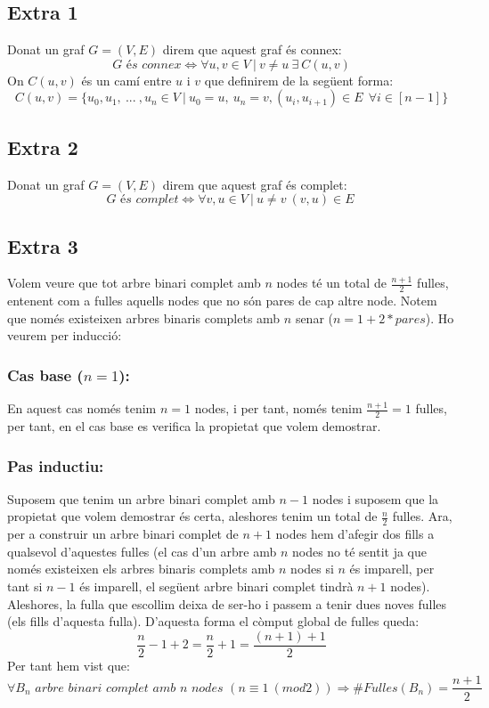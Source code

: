 \documentclass[a4paper,12pt]{article}
\begin{document}
\subsection*{Extra 1}
Donat un graf $G = (V,E)$ direm que aquest graf és connex:
$$G \textit{ és connex} \Longleftrightarrow \forall u, v \in V \ | \ v \neq u \ \exists \ C(u,v)$$
On $C(u,v)$ és un camí entre $u$ i $v$ que definirem de la següent forma:
$$C(u,v) = \{u_0, u_1, \ ... \ , u_n \in V \ | \ u_0 = u, \ u_n = v, (u_i, u_{i+1}) \in E \ \ \forall i \in [n-1]\}$$

\subsection*{Extra 2}
Donat un graf $G = (V,E)$ direm que aquest graf és complet:
$$G \textit{ és complet} \Longleftrightarrow \forall v, u \in V \ | \ u \neq v \ (v, u) \in E \ $$

\subsection*{Extra 3}
Volem veure que tot arbre binari complet amb $n$ nodes té un total de $\frac{n+1}{2}$ fulles, entenent com a fulles aquells nodes que no són pares de cap altre node. Notem que només existeixen arbres binaris complets amb $n$ senar ($n = 1 + 2*pares$). Ho veurem per inducció:
\subsubsection*{Cas base ($n = 1$):}
En aquest cas només tenim $n=1$ nodes, i per tant, només tenim $\frac{n+1}{2} = 1$ fulles, per tant, en el cas base es verifica la propietat que volem demostrar.
\subsubsection*{Pas inductiu:}
Suposem que tenim un arbre binari complet amb $n-1$ nodes i suposem que la propietat que volem demostrar és certa, aleshores tenim un total de $\frac{n}{2}$ fulles. Ara, per a construir un arbre binari complet de $n + 1$ nodes hem d'afegir dos fills a qualsevol d'aquestes fulles (el cas d'un arbre amb $n$ nodes no té sentit ja que només existeixen els arbres binaris complets amb $n$ nodes si $n$ és imparell, per tant si $n-1$ és imparell, el següent arbre binari complet tindrà $n+1$ nodes). Aleshores, la fulla que escollim deixa de ser-ho i passem a tenir dues noves fulles (els fills d'aquesta fulla). D'aquesta forma el còmput global de fulles queda:
$$\frac{n}{2} - 1 + 2 = \frac{n}{2} + 1 = \frac{(n+1)+1}{2}$$
Per tant hem vist que:
$$\forall B_n \textit{ arbre binari complet amb n nodes $\left(n \equiv 1 \ (mod 2)\right)$} \Longrightarrow \# Fulles(B_n) = \frac{n+1}{2}$$
\end{document}
